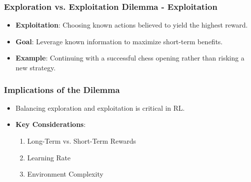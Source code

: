 \documentclass{beamer}
\begin{document}
\begin{frame}[fragile]
    \frametitle{Exploration vs. Exploitation Dilemma - Exploitation}
    \begin{itemize}
        \item \textbf{Exploitation}: Choosing known actions believed to yield the highest reward.
        \item \textbf{Goal}: Leverage known information to maximize short-term benefits.
        \item \textbf{Example}: Continuing with a successful chess opening rather than risking a new strategy.
    \end{itemize}
\end{frame}

\begin{frame}[fragile]
    \frametitle{Implications of the Dilemma}
    \begin{itemize}
        \item Balancing exploration and exploitation is critical in RL.
        \item \textbf{Key Considerations}:
        \begin{enumerate}
            \item Long-Term vs. Short-Term Rewards
            \item Learning Rate
            \item Environment Complexity
        \end{enumerate}
    \end{itemize}
\end{frame}
\end{document}
